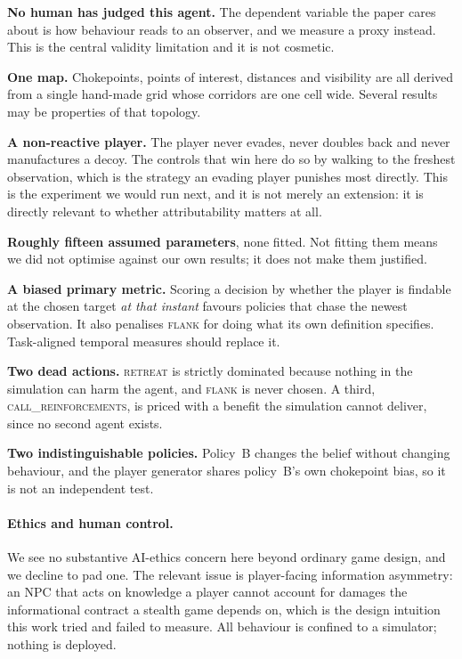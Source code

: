 \documentclass{article}
\begin{document}
\textbf{No human has judged this agent.} The dependent variable the paper cares about is how
behaviour reads to an observer, and we measure a proxy instead. This is the central validity
limitation and it is not cosmetic.

\textbf{One map.} Chokepoints, points of interest, distances and visibility are all derived from
a single hand-made grid whose corridors are one cell wide. Several results may be properties of
that topology.

\textbf{A non-reactive player.} The player never evades, never doubles back and never
manufactures a decoy. The controls that win here do so by walking to the freshest observation,
which is the strategy an evading player punishes most directly. This is the experiment we would
run next, and it is not merely an extension: it is directly relevant to whether attributability
matters at all.

\textbf{Roughly fifteen assumed parameters}, none fitted. Not fitting them means we did not
optimise against our own results; it does not make them justified.

\textbf{A biased primary metric.} Scoring a decision by whether the player is findable at the
chosen target \emph{at that instant} favours policies that chase the newest observation. It also
penalises \textsc{flank} for doing what its own definition specifies. Task-aligned temporal
measures should replace it.

\textbf{Two dead actions.} \textsc{retreat} is strictly dominated because nothing in the
simulation can harm the agent, and \textsc{flank} is never chosen. A third,
\textsc{call\_reinforcements}, is priced with a benefit the simulation cannot deliver, since no
second agent exists.

\textbf{Two indistinguishable policies.} Policy~B changes the belief without changing behaviour,
and the player generator shares policy~B's own chokepoint bias, so it is not an independent
test.

\paragraph{Ethics and human control.}
We see no substantive AI-ethics concern here beyond ordinary game design, and we decline to pad
one. The relevant issue is player-facing information asymmetry: an NPC that acts on knowledge a
player cannot account for damages the informational contract a stealth game depends on, which is
the design intuition this work tried and failed to measure. All behaviour is confined to a
simulator; nothing is deployed.
\end{document}
